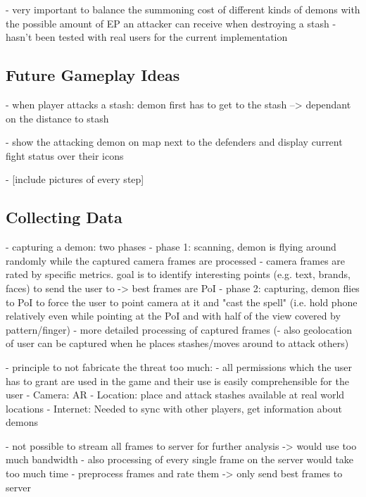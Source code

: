- very important to balance the summoning cost of different kinds of demons with the possible amount of EP an attacker can receive when destroying a stash
- hasn't been tested with real users for the current implementation

\subsection{Future Gameplay Ideas}
\label{subsec:futuregameplayideas}

- when player attacks a stash: demon first has to get to the stash --> dependant on the distance to stash 

- show the attacking demon on map next to the defenders and display current fight status over their icons


- [include pictures of every step]

\subsection{Collecting Data}
\label{subsec:collectingdata}

- capturing a demon: two phases
- phase 1: scanning, demon is flying around randomly while the captured camera frames are processed
- camera frames are rated by specific metrics. goal is to identify interesting points (e.g. text, brands, faces) to send the user to -> best frames are PoI
- phase 2: capturing, demon flies to PoI to force the user to point camera at it and "cast the spell" (i.e. hold phone relatively even while pointing at the PoI and with half of the view covered by pattern/finger)
- more detailed processing of captured frames
(- also geolocation of user can be captured when he places stashes/moves around to attack others)

- principle to not fabricate the threat too much:
- all permissions which the user has to grant are used in the game and their use is easily comprehensible for the user
 - Camera: AR
 - Location: place and attack stashes available at real world locations
 - Internet: Needed to sync with other players, get information about demons
 
- not possible to stream all frames to server for further analysis -> would use too much bandwidth
- also processing of every single frame on the server would take too much time 
- preprocess frames and rate them -> only send best frames to server
